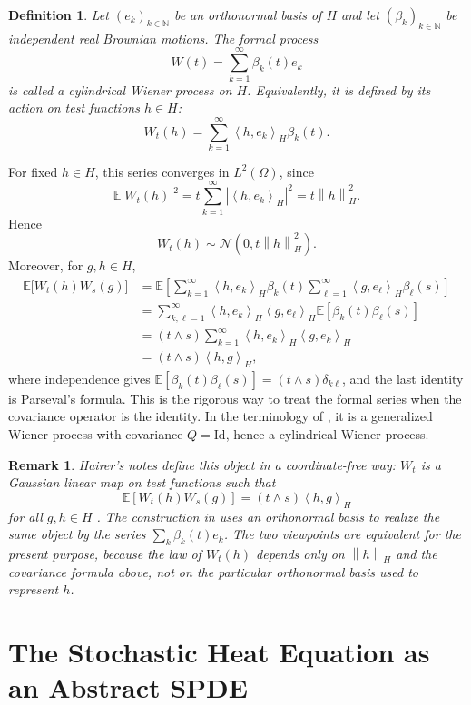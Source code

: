 \documentclass[11pt,a4paper]{article}
\newtheorem{definition}[theorem]{Definition}
\newtheorem{remark}[theorem]{Remark}
\newcommand{\N}{\mathbb{N}}
\newcommand{\E}{\mathbb{E}}
\newcommand{\Id}{\mathrm{Id}}
\newcommand{\norm}[1]{\left\lVert #1 \right\rVert}
\newcommand{\ip}[2]{\left\langle #1,#2 \right\rangle}
\begin{document}
\begin{definition}
Let \((e_k)_{k\in\N}\) be an orthonormal basis of \(H\) and let
\((\beta_k)_{k\in\N}\) be independent real Brownian motions. The formal process
\[
  W(t)=\sum_{k=1}^{\infty}\beta_k(t)e_k
\]
is called a cylindrical Wiener process on \(H\). Equivalently, it is defined by
its action on test functions \(h\in H\):
\[
  W_t(h)
  =
  \sum_{k=1}^{\infty}\ip{h}{e_k}_H\beta_k(t).
\]
\end{definition}

For fixed \(h\in H\), this series converges in \(L^2(\Omega)\), since
\[
  \E|W_t(h)|^2
  =
  t\sum_{k=1}^{\infty}|\ip{h}{e_k}_H|^2
  =
  t\norm{h}_H^2.
\]
Hence
\[
  W_t(h)\sim\mathcal N(0,t\norm{h}_H^2).
\]
Moreover, for \(g,h\in H\),
\[
\begin{aligned}
  \E\bigl[W_t(h)W_s(g)\bigr]
  &=
  \E\left[
    \sum_{k=1}^{\infty}\ip{h}{e_k}_H\beta_k(t)
    \sum_{\ell=1}^{\infty}\ip{g}{e_\ell}_H\beta_\ell(s)
  \right]  \\
  &=
  \sum_{k,\ell=1}^{\infty}
  \ip{h}{e_k}_H\ip{g}{e_\ell}_H
  \E[\beta_k(t)\beta_\ell(s)]  \\
  &=
  (t\wedge s)
  \sum_{k=1}^{\infty}\ip{h}{e_k}_H\ip{g}{e_k}_H  \\
  &=
  (t\wedge s)\ip{h}{g}_H,
\end{aligned}
\]
where independence gives
\(\E[\beta_k(t)\beta_\ell(s)]=(t\wedge s)\delta_{k\ell}\), and the last
identity is Parseval's formula.
This is the rigorous way to treat the formal series when the covariance
operator is the identity. In the terminology of \cite{delSarto2025}, it is a
generalized Wiener process with covariance \(Q=\Id\), hence a cylindrical Wiener
process.

\begin{remark}
Hairer's notes define this object in a coordinate-free way: \(W_t\) is a
Gaussian linear map on test functions such that
\[
  \E[W_t(h)W_s(g)]=(t\wedge s)\ip{h}{g}_H
\]
for all \(g,h\in H\) \cite{hairer2009}. The construction in
\cite{delSarto2025} uses an orthonormal basis to realize the same object by
the series \(\sum_k\beta_k(t)e_k\). The two viewpoints are equivalent for the
present purpose, because the law of \(W_t(h)\) depends only on
\(\norm{h}_H\) and the covariance formula above, not on the particular
orthonormal basis used to represent \(h\).
\end{remark}

\section{The Stochastic Heat Equation as an Abstract SPDE}
\end{document}
